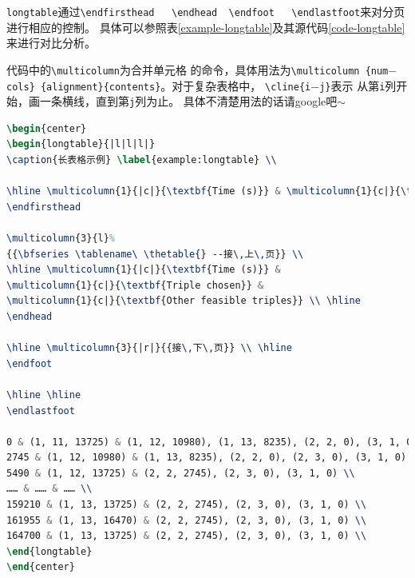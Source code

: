 \texttt{longtable}通过\texttt{\textbackslash endfirsthead~~
\textbackslash endhead~~\textbackslash endfoot~~
\textbackslash endlastfoot}来对分页进行相应的控制。
具体可以参照表\ref{example-longtable}及其源代码\ref{code-longtable}
来进行对比分析。

代码中的\texttt{\textbackslash multicolumn}为合并单元格
的命令，具体用法为\texttt{\textbackslash multicolumn \{num$-$cols\}
\{alignment\}\{contents\}}。对于复杂表格中，
\texttt{\textbackslash cline\{i$-$j\}}表示
从第\texttt{i}列开始，画一条横线，直到第\texttt{j}列为止。
具体不清楚用法的话请google吧$\sim$

\begin{lstlisting}[caption={跨页表格示例},label={code-longtable},language={LaTeX}]
\begin{center}
\begin{longtable}{|l|l|l|}
\caption{长表格示例} \label{example:longtable} \\

\hline \multicolumn{1}{|c|}{\textbf{Time (s)}} & \multicolumn{1}{c|}{\textbf{Triple chosen}} & \multicolumn{1}{c|}{\textbf{Other feasible triples}} \\ \hline 
\endfirsthead

\multicolumn{3}{l}%
{{\bfseries \tablename\ \thetable{} --接\,上\,页}} \\
\hline \multicolumn{1}{|c|}{\textbf{Time (s)}} &
\multicolumn{1}{c|}{\textbf{Triple chosen}} &
\multicolumn{1}{c|}{\textbf{Other feasible triples}} \\ \hline
\endhead

\hline \multicolumn{3}{|r|}{{接\,下\,页}} \\ \hline
\endfoot

\hline \hline
\endlastfoot

0 & (1, 11, 13725) & (1, 12, 10980), (1, 13, 8235), (2, 2, 0), (3, 1, 0) \\
2745 & (1, 12, 10980) & (1, 13, 8235), (2, 2, 0), (2, 3, 0), (3, 1, 0) \\
5490 & (1, 12, 13725) & (2, 2, 2745), (2, 3, 0), (3, 1, 0) \\
…… & …… & …… \\
159210 & (1, 13, 13725) & (2, 2, 2745), (2, 3, 0), (3, 1, 0) \\
161955 & (1, 13, 16470) & (2, 2, 2745), (2, 3, 0), (3, 1, 0) \\
164700 & (1, 13, 13725) & (2, 2, 2745), (2, 3, 0), (3, 1, 0) \\
\end{longtable}
\end{center}
\end{lstlisting}